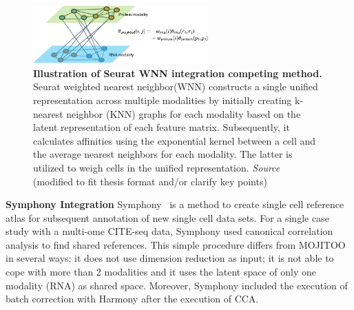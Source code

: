 \begin{description}
    \begin{figure}[!ht]
    	\centering
    	\includegraphics[width=0.60\textwidth]{Alg_WNN/fig}
    	\vspace{0.1cm}
    	\caption[Illustration of Seurat WNN integration competing method.]{\textbf{Illustration of Seurat WNN integration competing method.} Seurat weighted nearest neighbor(WNN) constructs a single unified representation across multiple modalities by initially creating k-nearest neighbor (KNN) graphs for each modality based on the latent representation of each feature matrix. Subsequently, it calculates affinities using the exponential kernel between a cell and the average nearest neighbors for each modality. The latter is utilized to weigh cells in the unified representation. \emph{Source~\cite{hao2021seurat4}} (modified to fit thesis format and/or clarify key points)
    }
    	\label{fig:Alg_WNN}
    \end{figure}

    \item \textbf{Symphony Integration}
    Symphony~\cite{kang2021symphony} is a method to create single cell reference atlas for subsequent annotation of new single cell data sets. For a single case study with a multi-ome CITE-seq data, Symphony used canonical correlation analysis to find shared references. This simple procedure differs from MOJITOO in several ways: it does not use dimension reduction as input; it is not able to cope with more than 2 modalities and it uses the latent space of only one modality (RNA) as shared space.  Moreover, Symphony included the execution of batch correction with Harmony after the execution of CCA.

\end{description}

